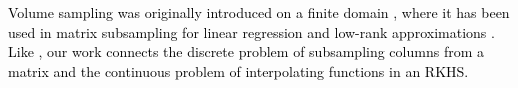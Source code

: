 \documentclass[twoside,11pt]{book}
\newcommand{\rev}[1]{\textcolor{black}{#1}}
\numberwithin{theorem}{chapter}
\numberwithin{definition}{chapter}
\numberwithin{proposition}{chapter}
\numberwithin{corollary}{chapter}
\numberwithin{example}{chapter}
\numberwithin{lemma}{chapter}
\numberwithin{assumption}{chapter}
\numberwithin{equation}{chapter}
\numberwithin{figure}{chapter}
\begin{document}
\rev{
Volume sampling was originally introduced on a finite domain \citep{DRVW06}, where it has been used in matrix subsampling for linear regression and low-rank approximations \citep{DeWa17,BeBaCh18}. Like \citep{BeBaCh19}, our work connects the discrete problem of subsampling columns from a matrix and the continuous problem of interpolating functions in an RKHS.
}











\end{document}
